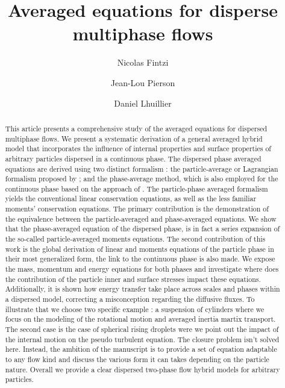 \documentclass[11pt]{My_preprint}
\title{Averaged equations for disperse multiphase flows}
\author[1,2]{Nicolas Fintzi}
\author[1]{Jean-Lou Pierson}
\author[2]{Daniel Lhuillier}
\affil[1]{IFP Energies Nouvelles, Rond-point de l’changeur de Solaize, 69360 Solaize}
\affil[2]{Sorbonne Université, Institut Jean le Rond $\partial$’Alembert, 4 place Jussieu, 75252 PARIS CEDEX 05, France}
\begin{document}
\maketitle

\begin{abstract}
    This article presents a comprehensive study of the averaged equations for dispersed multiphase flows.
    We present a systematic derivation of a general averaged hybrid model that incorporates the influence of internal properties and surface properties of arbitrary particles dispersed in a continuous phase.
    The dispersed phase averaged equations are derived using two distinct formalism :
    the particle-average or Lagrangian formalism proposed by \citet{zhang1994ensemble,jackson1997locally};
    and the phase-average method, which is also employed for the continuous phase based on the approach of \citet{drew1983mathematical}. 
    The particle-phase averaged formalism yields the conventional linear conservation equations, as well as the less familiar moments' conservation equations.
    The primary contribution is the demonstration of the equivalence between the particle-averaged and phase-averaged equations. 
    We show that the phase-averaged equation of the dispersed phase, is in fact a series expansion of the so-called particle-averaged moments equations. 
    The second contribution of this work is the global derivation of linear and moments equations of the particle phase in their most generalized form, the link to the continuous phase is also made. 
    We expose the mass, momentum and energy equations for both phases and investigate where does the contribution of the particle inner and surface stresses impact these equations. 
    Additionally, it is shown how energy transfer take place across scales and phases within a dispersed model, correcting a misconception regarding the diffusive fluxes. 
    To illustrate that we choose two specific example : a suspension of cylinders where we focus on the modeling of the rotational motion and averaged inertia martix transport. 
    The second case is the case of spherical rising droplets were we point out the impact of the internal motion on the pseudo turbulent equation. 
    The closure problem isn't solved here. 
    Instead, the ambition of the manuscript is to provide a set of equation adaptable to any flow kind and discuss the various form it can takes depending on the particle nature. 
    Overall we provide a clear dispersed two-phase flow hybrid models for arbitrary particles. 
\end{abstract}
\end{document}
